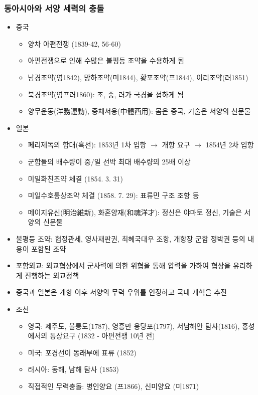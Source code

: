 \subsubsection*{동아시아와 서양 세력의 충돌}
\begin{itemize}
    \item 중국
    \begin{itemize}
        \item 양차 아편전쟁 (1839-42, 56-60)
        \item 아편전쟁으로 인해 수많은 불평등 조약을 수용하게 됨
        \item 남경조약(영1842), 망하조약(미1844), 황포조약(프1844), 이리조약(러1851)
        \item 북경조약(영프러1860): 조, 중, 러가 국경을 접하게 됨
        \item 양무운동(洋務運動), 중체서용(中體西用): 몸은 중국, 기술은 서양의 신문물
    \end{itemize}
    \pagebreak
    \item 일본
        \begin{itemize}
            \item 페리제독의 함대(흑선): 1853년 1차 입항 $\rightarrow$ 개항 요구 $\rightarrow$ 1854년 2차 입항
            \item 군함들의 배수량이 중/일 선박 최대 배수량의 25배 이상
            \item 미일화친조약 체결 (1854. 3. 31)
            \item 미일수호통상조약 체결 (1858. 7. 29): 표류민 구조 조항 등
            \item 메이지유신(明治維新), 화혼양재(和魂洋才): 정신은 야마토 정신, 기술은 서양의 신문물
        \end{itemize}
    \item 불평등 조약: 협정관세, 영사재판권, 최혜국대우 조항, 개항장 군함 정박권 등의 내용이 포함된 조약
    \item 포함외교: 외교협상에서 군사력에 의한 위협을 통해 압력을 가하여 협상을 유리하게 진행하는 외교정책
    \item 중국과 일본은 개항 이후 서양의 무력 우위를 인정하고 국내 개혁을 추진
    \item 조선
    \begin{itemize}
        \item 영국: 제주도, 울릉도(1787), 영흥만 용당포(1797), 서남해안 탐사(1816), 홍성에서의 통상요구 (1832 - 아편전쟁 10년 전)
        \item 미국: 포경선이 동래부에 표류 (1852)
        \item 러시아: 동해, 남해 탐사 (1853)
        \item 직접적인 무력충돌: 병인양요 (프1866), 신미양요 (미1871)
    \end{itemize}
\end{itemize}

